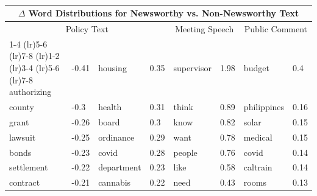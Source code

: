 \documentclass[11pt]{article}
\begin{document}

\begin{table}\
\centering
\begin{tabular}{llllllll}
\toprule
\multicolumn{8}{c}{$\Delta$ Word Distributions for Newsworthy vs. Non-Newsworthy Text} \\
\midrule
\multicolumn{4}{c}{Policy Text} & \multicolumn{2}{c}{Meeting Speech} & \multicolumn{2}{c}{Public Comment} \\ 
\cmidrule(lr){1-4} \cmidrule(lr){5-6} \cmidrule(lr){7-8}
\cmidrule(lr){1-2} \cmidrule(lr){3-4} \cmidrule(lr){5-6} \cmidrule(lr){7-8}
authorizing & \cellcolor{red!41} -0.41 &       housing & \cellcolor{blue!35} 0.35 & supervisor & \cellcolor{green!66} 1.98 &      budget &  \cellcolor{purple!40} 0.4 \\
     county &  \cellcolor{red!30} -0.3 &        health & \cellcolor{blue!31} 0.31 &      think & \cellcolor{green!29} 0.89 & philippines & \cellcolor{purple!16} 0.16 \\
      grant & \cellcolor{red!26} -0.26 &         board &  \cellcolor{blue!30} 0.3 &       know & \cellcolor{green!27} 0.82 &       solar & \cellcolor{purple!15} 0.15 \\
    lawsuit & \cellcolor{red!25} -0.25 &     ordinance & \cellcolor{blue!28} 0.29 &       want & \cellcolor{green!26} 0.78 &     medical & \cellcolor{purple!15} 0.15 \\
      bonds & \cellcolor{red!23} -0.23 &         covid & \cellcolor{blue!28} 0.28 &     people & \cellcolor{green!25} 0.76 &       covid & \cellcolor{purple!14} 0.14 \\
 settlement & \cellcolor{red!22} -0.22 &    department & \cellcolor{blue!23} 0.23 &       like & \cellcolor{green!19} 0.58 &    caltrain & \cellcolor{purple!14} 0.14 \\
   contract & \cellcolor{red!21} -0.21 &      cannabis & \cellcolor{blue!22} 0.22 &       need & \cellcolor{green!14} 0.43 &       rooms & \cellcolor{purple!13} 0.13 \\

\end{tabular}
\end{table}
\end{document}
